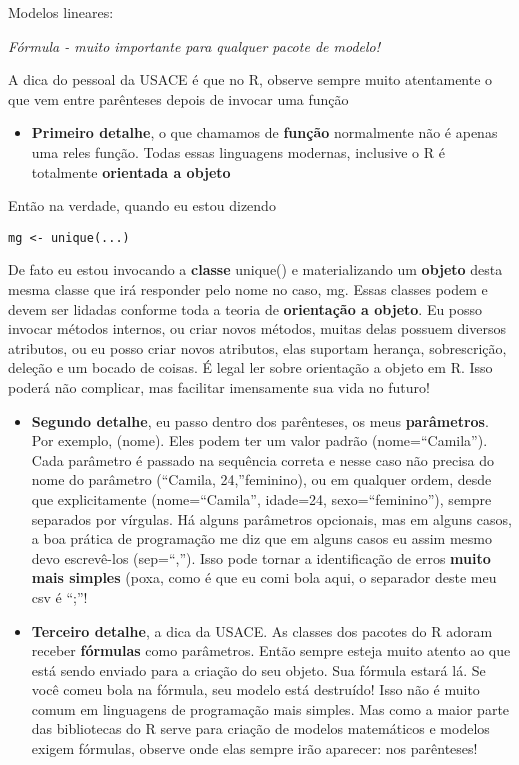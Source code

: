 \documentclass[11pt]{article}
\providecommand{\tightlist}{%
      \setlength{\itemsep}{0pt}\setlength{\parskip}{0pt}}
\begin{document}
    Modelos lineares:

\emph{Fórmula - muito importante para qualquer pacote de modelo!}

A dica do pessoal da USACE é que no R, observe sempre muito atentamente
o que vem entre parênteses depois de invocar uma função

\begin{itemize}
\tightlist
\item
  \textbf{Primeiro detalhe}, o que chamamos de \textbf{função}
  normalmente não é apenas uma reles função. Todas essas linguagens
  modernas, inclusive o R é totalmente \textbf{orientada a objeto}
\end{itemize}

Então na verdade, quando eu estou dizendo

\begin{verbatim}
mg <- unique(...)
\end{verbatim}

De fato eu estou invocando a \textbf{classe} unique() e materializando
um \textbf{objeto} desta mesma classe que irá responder pelo nome no
caso, mg. Essas classes podem e devem ser lidadas conforme toda a teoria
de \textbf{orientação a objeto}. Eu posso invocar métodos internos, ou
criar novos métodos, muitas delas possuem diversos atributos, ou eu
posso criar novos atributos, elas suportam herança, sobrescrição,
deleção e um bocado de coisas. É legal ler sobre orientação a objeto em
R. Isso poderá não complicar, mas facilitar imensamente sua vida no
futuro!

\begin{itemize}
\item
  \textbf{Segundo detalhe}, eu passo dentro dos parênteses, os meus
  \textbf{parâmetros}. Por exemplo, (nome). Eles podem ter um valor
  padrão (nome=``Camila''). Cada parâmetro é passado na sequência
  correta e nesse caso não precisa do nome do parâmetro (``Camila,
  24,''feminino), ou em qualquer ordem, desde que explicitamente
  (nome=``Camila'', idade=24, sexo=``feminino''), sempre separados por
  vírgulas. Há alguns parâmetros opcionais, mas em alguns casos, a boa
  prática de programação me diz que em alguns casos eu assim mesmo devo
  escrevê-los (sep=``,''). Isso pode tornar a identificação de erros
  \textbf{muito mais simples} (poxa, como é que eu comi bola aqui, o
  separador deste meu csv é ``;''!
\item
  \textbf{Terceiro detalhe}, a dica da USACE. As classes dos pacotes do
  R adoram receber \textbf{fórmulas} como parâmetros. Então sempre
  esteja muito atento ao que está sendo enviado para a criação do seu
  objeto. Sua fórmula estará lá. Se você comeu bola na fórmula, seu
  modelo está destruído! Isso não é muito comum em linguagens de
  programação mais simples. Mas como a maior parte das bibliotecas do R
  serve para criação de modelos matemáticos e modelos exigem fórmulas,
  observe onde elas sempre irão aparecer: nos parênteses!
\end{itemize}
\end{document}
